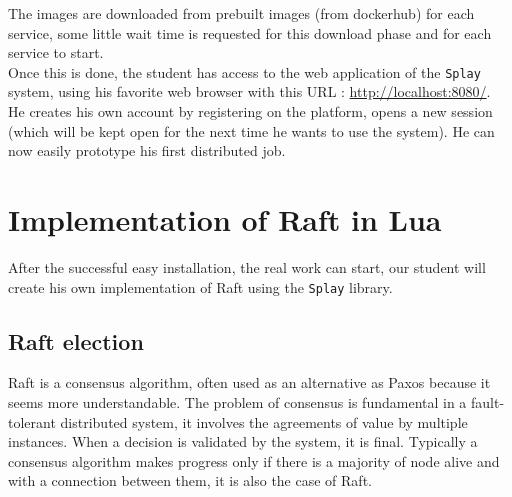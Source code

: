 \documentclass{eplmastersthesis}
\begin{document}
      The images are downloaded from prebuilt images (from dockerhub) for
      each service, some little wait time is requested for this download
      phase and for each service to start.\\
      Once this is done, the student has access to the web application of
      the \texttt{Splay} system, using his favorite web browser with this URL :
      \url{http://localhost:8080/}.\\
      He creates his own account by registering on the platform, opens a new
      session (which will be kept open for the next time he wants to use
      the system). He can now easily prototype his first distributed job.

    \section{Implementation of Raft in Lua}

      After the successful easy installation, the real work can start, our
      student will create his own implementation of Raft using the \texttt{Splay}
      library.

      \subsection{Raft election}

        Raft is a consensus algorithm, often used as an alternative as Paxos because
        it seems more understandable. The problem of consensus is fundamental
        in a fault-tolerant distributed system, it involves the agreements of
        value by multiple instances. When a decision is validated by the system,
        it is final. Typically a consensus algorithm makes progress only if there is
        a majority of node alive and with a connection between them, it is
        also the case of Raft. \\
\end{document}

